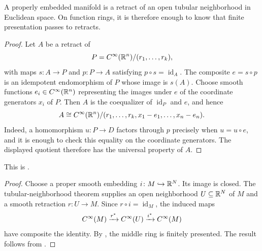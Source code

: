 A properly embedded manifold is a retract of an open tubular neighborhood
in Euclidean space. On function rings, it is therefore enough to know that
finite presentation passes to retracts.


\begin{proof}
  Let $A$ be a retract of
  \[
    P=C^\infty(\mathbb{R}^n)/(r_1,\ldots,r_k),
  \]
  with maps $s\colon A\to P$ and $p\colon P\to A$ satisfying
  $p\circ s=\operatorname{id}_A$. The composite $e=s\circ p$ is an
  idempotent endomorphism of $P$ whose image is $s(A)$. Choose smooth
  functions $e_i\in C^\infty(\mathbb{R}^n)$ representing the images under $e$ of the
  coordinate generators $x_i$ of $P$. Then $A$ is the coequalizer of
  $\operatorname{id}_P$ and $e$, and hence
  \[
    A\cong
    C^\infty(\mathbb{R}^n)/
    (r_1,\ldots,r_k,x_1-e_1,\ldots,x_n-e_n).
  \]
  Indeed, a homomorphism $u\colon P\to D$ factors through $p$ precisely when
  $u=u\circ e$, and it is enough to check this equality on the coordinate
  generators. The displayed quotient therefore has the universal property of
  $A$.
\end{proof}


This is \citet[Chapter~I, Theorem~2.3]{Moerdijk_Reyes_Smooth_Infinitesimal_Analysis}.

\begin{proof}
  Choose a proper smooth embedding $i\colon M\hookrightarrow\mathbb{R}^N$. Its image
  is closed. The tubular-neighborhood theorem supplies an open neighborhood
  $U\subseteq\mathbb{R}^N$ of $M$ and a smooth retraction $r\colon U\to M$. Since
  $r\circ i=\operatorname{id}_M$, the induced maps
  \[
    C^\infty(M)
    \xrightarrow{r^*}
    C^\infty(U)
    \xrightarrow{i^*}
    C^\infty(M)
  \]
  have composite the identity. By , the
  middle ring is finitely presented. The result follows from
  .
\end{proof}

